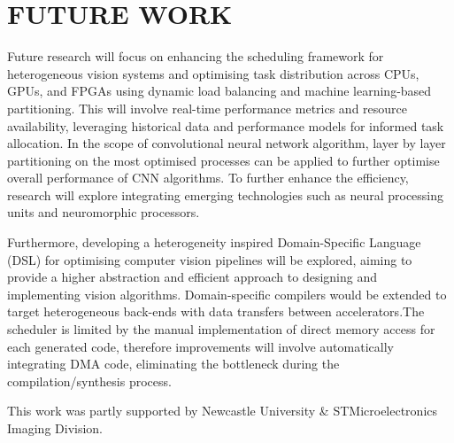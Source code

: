 \documentclass[]{spie}  %
\begin{document}
\section{FUTURE WORK}
\label{sec:future work}

Future research will focus on enhancing the scheduling framework for heterogeneous vision systems and optimising task distribution across CPUs, GPUs, and FPGAs using dynamic load balancing and machine learning-based partitioning. This will involve real-time performance metrics and resource availability, leveraging historical data and performance models for informed task allocation. In the scope of convolutional neural network algorithm, layer by layer partitioning on the most optimised processes can be applied to further optimise overall performance of CNN algorithms. To further enhance the efficiency, research will explore integrating emerging technologies such as neural processing units and neuromorphic processors. 

Furthermore, developing a heterogeneity inspired Domain-Specific Language (DSL) for optimising computer vision pipelines will be explored, aiming to provide a higher abstraction and efficient approach to designing and implementing vision algorithms. Domain-specific compilers would be extended to target heterogeneous back-ends with data transfers between accelerators.The scheduler is limited by the manual implementation of direct memory access for each generated code, therefore improvements will involve automatically integrating DMA code, eliminating the bottleneck during the compilation/synthesis process.









\acknowledgments %
 
This work was partly supported by Newcastle University \& STMicroelectronics Imaging Division.

\end{document}
